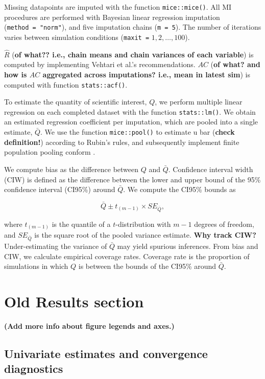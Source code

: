 \documentclass[Royal,times,sageh]{sagej}
\begin{document}
Missing datapoints are imputed with the function \texttt{mice::mice()}.
All MI procedures are performed with Bayesian linear regression
imputation (\texttt{method\ =\ "norm"}), and five imputation chains
(\texttt{m\ =\ 5}). The number of iterations varies between simulation
conditions (\texttt{maxit\ =} \(1, 2, \dots, 100\)).

\(\widehat{R}\) (\textbf{of what?? i.e., chain means and chain variances
of each variable}) is computed by implementing Vehtari et al.'s
\citeyearpar{veht19} recommendations. \(AC\) (\textbf{of what? and how
is \(AC\) aggregated across imputations? i.e., mean in latest sim}) is
computed with function \texttt{stats::acf()}.

To estimate the quantity of scientific interest, \(Q\), we perform
multiple linear regression on each completed dataset with the function
\texttt{stats::lm()}. We obtain an estimated regression coefficient per
imputation, which are pooled into a single estimate, \(\bar{Q}\). We use
the function \texttt{mice::pool()} to estimate u bar (\textbf{check
definition!}) according to Rubin's \citeyearpar{rubin87} rules, and
subsequently implement finite population pooling conform \citet{vink14}.

We compute bias as the difference between \(Q\) and \(\bar{Q}\).
Confidence interval width (CIW) is defined as the difference between the
lower and upper bound of the 95\% confidence interval (CI95\%) around
\(\bar{Q}\). We compute the CI95\% bounds as

\[\bar{Q} \pm t_{(m-1)} \times SE_{\bar{Q}},\]

where \(t_{(m-1)}\) is the quantile of a \(t\)-distribution with \(m-1\)
degrees of freedom, and \(SE_{\bar{Q}}\) is the square root of the
pooled variance estimate. \textbf{Why track CIW?} Under-estimating the
variance of \(\bar{Q}\) may yield spurious inferences. From bias and
CIW, we calculate empirical coverage rates. Coverage rate is the
proportion of simulations in which \(Q\) is between the bounds of the
CI95\% around \(\bar{Q}\).

\hypertarget{old-results-section}{%
\section{Old Results section}\label{old-results-section}}

\textbf{(Add more info about figure legends and axes.)}

\hypertarget{univariate-estimates-and-convergence-diagnostics}{%
\subsection{Univariate estimates and convergence
diagnostics}\label{univariate-estimates-and-convergence-diagnostics}}
\end{document}
